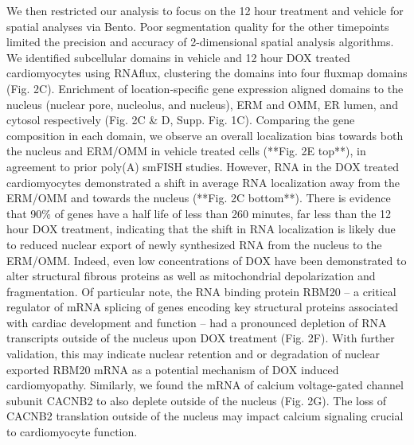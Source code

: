 We then restricted our analysis to focus on the 12 hour treatment and vehicle for spatial analyses via Bento. Poor segmentation quality for the other timepoints limited the precision and accuracy of 2-dimensional spatial analysis algorithms. We identified subcellular domains in vehicle and 12 hour DOX treated cardiomyocytes using RNAflux, clustering the domains into four fluxmap domains (Fig. 2C). Enrichment of location-specific gene expression aligned domains to the nucleus (nuclear pore, nucleolus, and nucleus), ERM and OMM, ER lumen, and cytosol respectively (Fig. 2C \& D, Supp. Fig. 1C). Comparing the gene composition in each domain, we observe an overall localization bias towards both the nucleus and ERM/OMM in vehicle treated cells (**Fig. 2E top**), in agreement to prior poly(A) smFISH studies\cite{lewisLocalizationTranscriptsTranslation2018}. However, RNA in the DOX treated cardiomyocytes demonstrated a shift in average RNA localization away from the ERM/OMM and towards the nucleus (**Fig. 2C bottom**). There is evidence that 90\% of genes have a half life of less than 260 minutes\cite{smalecGenomewideQuantificationRNA2022}, far less than the 12 hour DOX treatment, indicating that the shift in RNA localization is likely due to reduced nuclear export of newly synthesized RNA from the nucleus to the ERM/OMM. Indeed, even low concentrations of DOX have been demonstrated to alter structural fibrous proteins as well as mitochondrial depolarization and fragmentation\cite{sardaoMorphologicalAlterationsInduced2009}. Of particular note, the RNA binding protein RBM20 – a critical regulator of mRNA splicing of genes encoding key structural proteins associated with cardiac development and function – had a pronounced depletion of RNA transcripts outside of the nucleus upon DOX treatment (Fig. 2F). With further validation, this may indicate nuclear retention and or degradation of nuclear exported RBM20 mRNA as a potential mechanism of DOX induced cardiomyopathy. Similarly, we found the mRNA of calcium voltage-gated channel subunit CACNB2 to also deplete outside of the nucleus (Fig. 2G). The loss of CACNB2 translation outside of the nucleus may impact calcium signaling crucial to cardiomyocyte function\cite{meissnerModerateCalciumChannel2011}.


